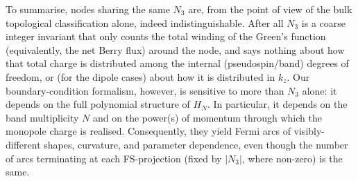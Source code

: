 \documentclass[aps,prb,onecolumn, footinbib, 10pt]{revtex4-2}
\begin{document}
To summarise, nodes sharing the same $N_3$ are, from the point of view of the bulk topological classification alone, indeed indistinguishable. After all $N_3$ is a coarse integer invariant that only counts the total winding of the Green's function (equivalently, the net Berry flux) around the node, and says nothing about how that total charge is distributed among the internal (pseudospin/band) degrees of freedom, or (for the dipole cases) about how it is distributed in $k_z$. Our boundary-condition formalism, however, is sensitive to more than $N_3$ alone: it depends on the full polynomial structure of $H_N$. In particular, it depends on the band multiplicity $N$ and on the power(s) of momentum through which the monopole charge is realised. Consequently, they yield Fermi arcs of visibly-different shapes, curvature, and parameter dependence, even though the number of arcs terminating at each FS-projection (fixed by $|N_3|$, where non-zero) is the same.
\end{document}
